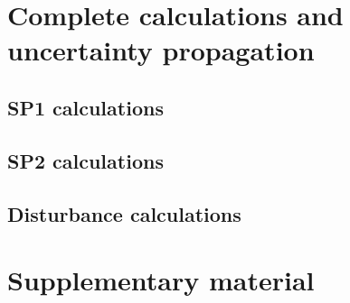 \documentclass[11pt,a4paper]{article}
\newif\ifdraft
\DeclareRobustCommand{\guide}[1]{\ifdraft\par\smallskip\small\itshape Draft guidance: #1\par\smallskip\fi}
\newcommand{\manual}[1]{\cite[printed pp.~#1]{labmanual}}
\begin{document}
\clearpage
\section{Complete calculations and uncertainty propagation}
\label{app:calculations}
\subsection{SP1 calculations}
\guide{Include all period and peak-ratio calculations, repeated-measurement statistics, frequency calculations, settling assessment, and propagated uncertainties. Sources: \manual{12--13, 22}.}
\subsection{SP2 calculations}
\guide{Include extrema and ranges, mean angle, stabilisation criterion checks, complete derivation if only its main steps appear in the report, and propagated uncertainties. Sources: \manual{15--16, 22}.}
\subsection{Disturbance calculations}
\guide{Include pre-disturbance averaging intervals and means, per-event peak calculations, recovery hold-interval checks, repeated-measurement statistics, and propagated uncertainties. Sources: \manual{18--19, 22}.}

\section{Supplementary material}
\label{app:supplementary}
\guide{Include supporting screenshots, calibration evidence, exported observations, and relevant calculation files if used. These item choices are assistant suggestions; supplementary material is permitted in the attachments by \manual{21--22}. Ensure each included item is identified and referenced in the report.}
\end{document}
